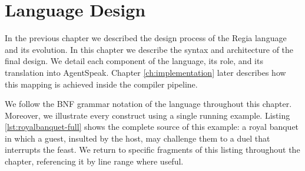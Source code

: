 \chapter{Language Design}
\label{ch:design}

In the previous chapter we described the design process of the Regia language and its evolution. In this chapter we describe the syntax and architecture of the final design. We detail each component of the language, its role, and its translation into AgentSpeak. Chapter \ref{ch:implementation} later describes how this mapping is achieved inside the compiler pipeline. 

We follow the BNF grammar notation of the language throughout this chapter. Moreover, we illustrate every construct using a single running example. Listing \ref{lst:royalbanquet-full} shows the complete source of this example: a royal banquet in which a guest, insulted by the host, may challenge them to a duel that interrupts the feast. We return to specific fragments of this listing throughout the chapter, referencing it by line range where useful.

